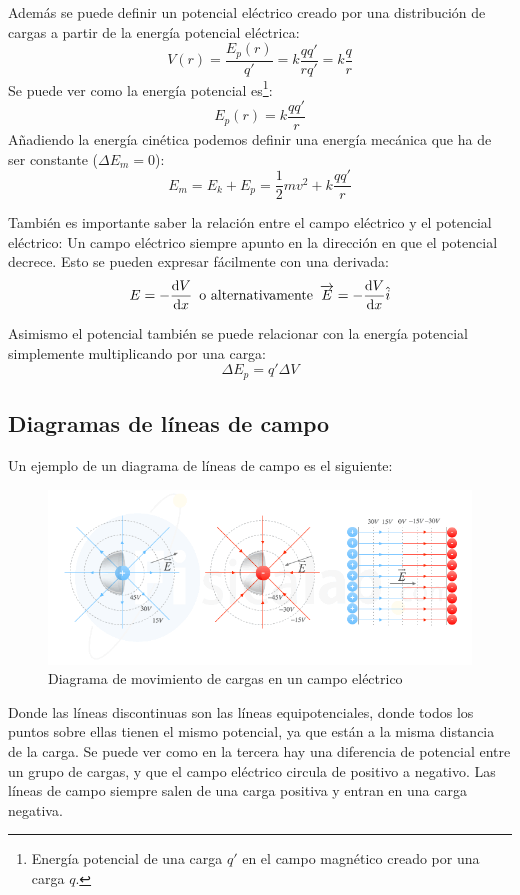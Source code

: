 \documentclass[arial,a4paper,print]{article}
\begin{document}
Además se puede definir un potencial eléctrico creado por una distribución de cargas a partir de la energía potencial eléctrica:
\begin{equation*}
	V(r) = \frac{E_{p}(r)}{q'} = k\frac{qq'}{rq'} = k\frac{q}{r}
\end{equation*} 
Se puede ver como la energía potencial es\footnote{Energía potencial de una carga $q'$ en el campo magnético creado por una carga $q$.}:
\begin{equation*}
	E_{p}(r)=k\frac{qq'}{r}
\end{equation*}
Añadiendo la energía cinética podemos definir una energía mecánica que ha de ser constante ($\Delta E_{m} = 0$):
\begin{equation*}
	E_{m} = E_{k} + E_{p} = \frac12 mv^{2} + k\frac{qq'}{r}
\end{equation*}

También es importante saber la relación entre el campo eléctrico y el potencial eléctrico: Un campo eléctrico siempre apunto en la dirección en que el potencial decrece. Esto se pueden expresar fácilmente con una derivada:
\begin{equation*}
	E = -\dv{V}{x}\,\text{ o alternativamente }\, \overrightarrow{E} = -\dv{V}{x}\hat{i}
\end{equation*}

Asimismo el potencial también se puede relacionar con la energía potencial simplemente multiplicando por una carga:
\begin{equation*}
	\Delta E_{p} = q'\Delta V
\end{equation*}

\pagebreak
\subsection{Diagramas de líneas de campo}
Un ejemplo de un diagrama de líneas de campo es el siguiente:
\begin{figure}[h]
	\centering
	\includegraphics[width=0.6\linewidth]{potencial-e-intensidad}
	\caption{Diagrama de movimiento de cargas en un campo eléctrico}
	\label{fig:potencial-e-intensidad}
\end{figure}
Donde las líneas discontinuas son las líneas equipotenciales, donde todos los puntos sobre ellas tienen el mismo potencial, ya que están a la misma distancia de la carga. Se puede ver como en la tercera hay una diferencia de potencial entre un grupo de cargas, y que el campo eléctrico circula de positivo a negativo. Las líneas de campo siempre salen de una carga positiva y entran en una carga negativa.
\end{document}
